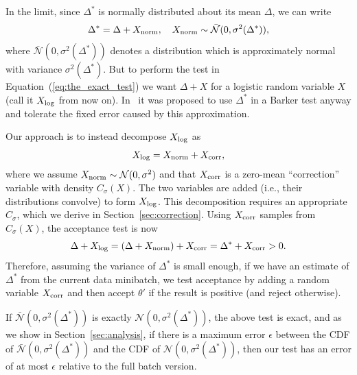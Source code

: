 \documentclass[twoside]{article} \usepackage{aistats2017}
\begin{document}
In the limit, since $\Delta^*$ is normally distributed about its mean $\Delta$,
we can write
\begin{equation}\label{eq:relationship}
    \Delta^* = \Delta + X_{\rm norm}, \quad X_{\rm norm} \sim \mathcal{\bar{N}}(0, \sigma^2(\Delta^*)),
\end{equation}
where $\mathcal{\bar{N}}(0, \sigma^2(\Delta^*))$ denotes a distribution which is
approximately normal with variance $\sigma^2(\Delta^*)$.  But to perform the
test in Equation~(\ref{eq:the_exact_test}) we want $\Delta + X$ for a logistic
random variable $X$ (call it $X_{\rm log}$ from now on). In~\citet{TallData15} it
was proposed to use $\Delta^*$ in a Barker test anyway and tolerate the fixed
error caused by this approximation. 

Our approach is to instead decompose $X_{\rm log}$ as
\begin{equation}\label{eq:deconvolution}
    X_{\rm log} = X_{\rm norm}+X_{\rm corr},
\end{equation}
where we assume $X_{\rm norm} \sim \mathcal{N}(0, \sigma^2)$ and that $X_{\rm
corr}$ is a zero-mean ``correction'' variable with density $C_{\sigma}(X)$.  The
two variables are added (i.e., their distributions convolve) to form $X_{\rm
log}$.  This decomposition requires an appropriate $C_\sigma$, which we derive
in Section~\ref{sec:correction}. Using $X_{\rm corr}$ samples from
$C_{\sigma}(X)$, the acceptance test is now
\begin{equation}\label{eq:criteria}
    \Delta + X_{\rm log} = (\Delta + X_{\rm norm}) + X_{\rm corr} = \Delta^* + X_{\rm corr} >0.
\end{equation}
Therefore, assuming the variance of $\Delta^*$ is small enough, if we have an
estimate of $\Delta^*$ from the current data minibatch, we test acceptance by
adding a random variable $X_{\rm corr}$ and then accept $\theta'$ if the result
is positive (and reject otherwise).

If $\mathcal{\bar{N}}(0, \sigma^2(\Delta^*))$ is exactly $\mathcal{N}(0,
\sigma^2(\Delta^*))$, the above test is exact, and as we show in
Section~\ref{sec:analysis}, if there is a maximum error $\epsilon$ between the
CDF of $\mathcal{\bar{N}}(0, \sigma^2(\Delta^*))$ and the CDF of $\mathcal{N}(0,
\sigma^2(\Delta^*))$, then our test has an error of at most $\epsilon$ relative
to the full batch version.



\end{document}
